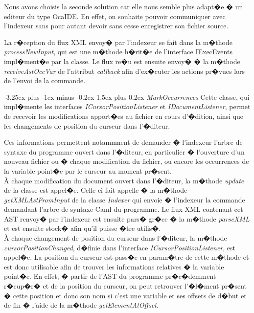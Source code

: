 \documentclass[a4paper,11pt,titlepage]{article}
\makeatletter
\renewcommand{\paragraph}{\@startsection{paragraph}{4}{0ex}%
   {-3.25ex plus -1ex minus -0.2ex}%
   {1.5ex plus 0.2ex}%
   {\normalfont\normalsize\bfseries}}
\makeatother
\begin{document}
Nous avons choisis la seconde solution car elle nous semble plus adapt�e � un editeur du type OcaIDE. En effet, on souhaite pouvoir communiquer avec l'indexeur sans pour autant devoir sans cesse enregistrer son fichier source.

La r�ception du flux XML envoy� par l'indexeur se fait dans la m�thode \textit{processNewInput}, qui est une m�thode h�rit�e de l'interface IExecEvents impl�ment�e par la classe. Le flux re�u est ensuite envoy� � la m�thode \textit{receiveAstOccVar} de l'attribut \textit{callback} afin d'ex�cuter les actions pr�vues lors de l'envoi de la commande.

\paragraph{\textit{MarkOccurrences}} Cette classe, qui impl�mente les interfaces \textit{ICursorPositionListener} et \textit{IDocumentListener}, permet de recevoir les modifications apport�es au fichier en cours d'�dition, ainsi que les changements de position du curseur dans l'�diteur. 

Ces informations permettent notammnent de demander � l'indexeur l'arbre de syntaxe du programme ouvert dans l'�diteur, en particulier � l'ouverture d'un nouveau fichier ou � chaque modification du fichier, ou encore les occurrences de la variable point�e par le curseur au moment pr�sent.\\

\`A chaque modification du document ouvert dans l'�diteur, la m�thode \textit{update} de la classe est appel�e. Celle-ci fait appelle � la m�thode \textit{getXMLAstFromInput} de la classe \textit{Indexer} qui envoie � l'indexeur la commande demandant l'arbre de syntaxe Caml du programme. Le flux XML contenant cet AST renvoy� par l'indexeur est ensuite pars� gr�ce � la m�thode \textit{parseXML} et est ensuite stock� afin qu'il puisse �tre utilis�.\\

\`A chaque changement de position du curseur dans l'�diteur, la m�thode \textit{cursorPositionChanged}, d�finie dans l'interface \textit{ICursorPositionListener}, est appel�e. La position du curseur est pass�e en param�tre de cette m�thode et est donc utilisable afin de trouver les informations relatives � la variable point�e. En effet, � partir de l'AST du programme pr�c�demment r�cup�r� et de la position du curseur, on peut retrouver l'�l�ment pr�sent � cette position et donc son nom si c'est une variable et ses offsets de d�but et de fin � l'aide de la m�thode \textit{getElementAtOffset}. 
\end{document}

